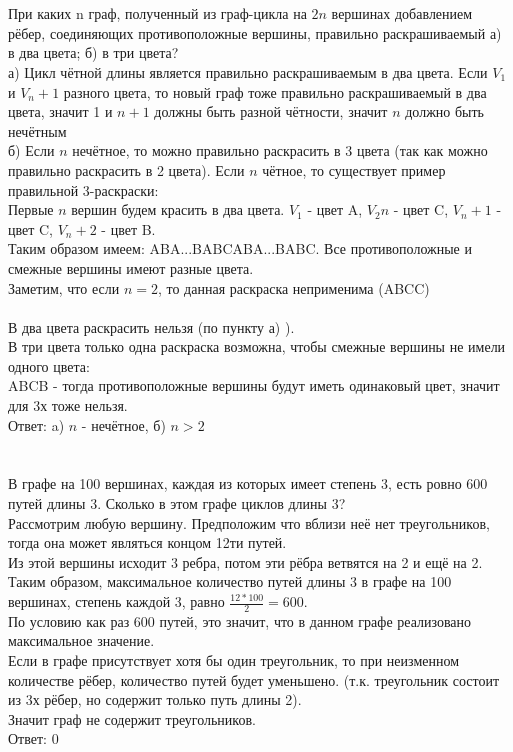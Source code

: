 \documentclass{article}
\begin{document}
\section{}
При каких n граф, полученный из граф-цикла на $2n$ вершинах добавлением рёбер, соединяющих противоположные вершины, правильно раскрашиваемый а) в два цвета; б) в три цвета?\\
а) Цикл чётной длины является правильно раскрашиваемым в два цвета.
Если $V_1$ и $V_n+1$ разного цвета, то новый граф тоже правильно раскрашиваемый в два цвета, значит 1 и $n+1$ должны быть разной чётности, значит $n$ должно быть нечётным\\
б) Если $n$ нечётное, то можно правильно раскрасить в 3 цвета (так как можно правильно раскрасить в 2 цвета).
Если $n$ чётное, то существует пример правильной 3-раскраски:\\
Первые $n$ вершин будем красить в два цвета. $V_1$ - цвет A, $V_2n$ - цвет C, $V_n+1$ - цвет C, $V_n+2$ - цвет B.\\
Таким образом имеем: ABA...BABCABA...BABC. Все противоположные и смежные вершины имеют разные цвета.\\
Заметим, что если $n=2$, то данная раскраска неприменима (ABCC)\\
\\В два цвета раскрасить нельзя (по пункту а) ).\\
В три цвета только одна раскраска возможна, чтобы смежные вершины не имели одного цвета:\\
ABCB - тогда противоположные вершины будут иметь одинаковый цвет, значит для 3х тоже нельзя.\\
Ответ: a) $n$ - нечётное, б) $n>2$
\section{}
В графе на 100 вершинах, каждая из которых имеет степень 3, есть ровно 600 путей длины 3. Сколько в этом графе циклов длины 3?\\
Рассмотрим любую вершину. Предположим что вблизи неё нет треугольников, тогда она может являться концом 12ти путей.\\
Из этой вершины исходит 3 ребра, потом эти рёбра ветвятся на 2 и ещё на 2.\\
Таким образом, максимальное количество путей длины 3 в графе на 100 вершинах, степень каждой 3, равно $\frac{12*100}{2}=600$.\\
По условию как раз 600 путей, это значит, что в данном графе реализовано максимальное значение.\\
Если в графе присутствует хотя бы один треугольник, то при неизменном количестве рёбер, количество путей будет уменьшено. (т.к. треугольник состоит из 3х рёбер, но содержит только путь длины 2).\\
Значит граф не содержит треугольников.\\
Ответ: 0
\end{document}
